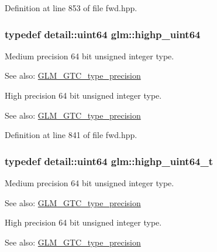 Definition at line 853 of file fwd.hpp.\hypertarget{group__gtc__type__precision_g8079c653e20cda03d34b99de629a7b09}{
\subsubsection[highp\_\-uint64]{\setlength{\rightskip}{0pt plus 5cm}typedef detail::uint64 {\bf glm::highp\_\-uint64}}}
\label{group__gtc__type__precision_g8079c653e20cda03d34b99de629a7b09}


Medium precision 64 bit unsigned integer type. \begin{Desc}
\item[See also:]\hyperlink{group__gtc__type__precision}{GLM\_\-GTC\_\-type\_\-precision}\end{Desc}
High precision 64 bit unsigned integer type. \begin{Desc}
\item[See also:]\hyperlink{group__gtc__type__precision}{GLM\_\-GTC\_\-type\_\-precision} \end{Desc}


Definition at line 841 of file fwd.hpp.\hypertarget{group__gtc__type__precision_g6e66f40c5909bfc872b068187fa6029e}{
\subsubsection[highp\_\-uint64\_\-t]{\setlength{\rightskip}{0pt plus 5cm}typedef detail::uint64 {\bf glm::highp\_\-uint64\_\-t}}}
\label{group__gtc__type__precision_g6e66f40c5909bfc872b068187fa6029e}


Medium precision 64 bit unsigned integer type. \begin{Desc}
\item[See also:]\hyperlink{group__gtc__type__precision}{GLM\_\-GTC\_\-type\_\-precision}\end{Desc}
High precision 64 bit unsigned integer type. \begin{Desc}
\item[See also:]\hyperlink{group__gtc__type__precision}{GLM\_\-GTC\_\-type\_\-precision} \end{Desc}


